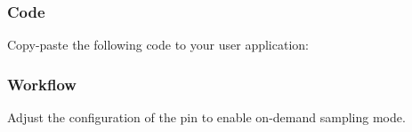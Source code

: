 \hypertarget{asfdoc_sam0_system_pinmux_basic_use_case_asfdoc_sam0_system_pinmux_basic_use_case_code}{}\subsubsection{Code}\label{asfdoc_sam0_system_pinmux_basic_use_case_asfdoc_sam0_system_pinmux_basic_use_case_code}
Copy-\/paste the following code to your user application\+: 
\begin{DoxyCodeInclude}{0}
\end{DoxyCodeInclude}
 \hypertarget{asfdoc_sam0_system_pinmux_basic_use_case_asfdoc_sam0_system_pinmux_basic_use_case_flow}{}\subsubsection{Workflow}\label{asfdoc_sam0_system_pinmux_basic_use_case_asfdoc_sam0_system_pinmux_basic_use_case_flow}

\begin{DoxyEnumerate}
\item Adjust the configuration of the pin to enable on-\/demand sampling mode. 
\begin{DoxyCodeInclude}{0}
\end{DoxyCodeInclude}

\end{DoxyEnumerate}